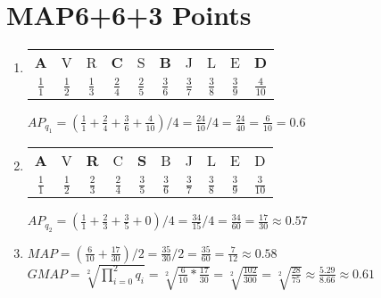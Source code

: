 \documentclass[10pt,a4paper]{article}
\begin{document}
\section{\hfill MAP\hfill 6+6+3 Points}
\begin{enumerate}
    \item \begin{tabular}[t]{cccccccccc}
            \textbf{A}   &V  &R  &\textbf{C}  &S  &\textbf{B}  &J  &L  &E  &\textbf{D} \\
            $\frac{1}{1}$   &$\frac{1}{2}$&$\frac{1}{3}$&$\frac{2}{4}$&$\frac{2}{5}$&$\frac{3}{6}$&$\frac{3}{7}$&$\frac{3}{8}$&$\frac{3}{9}$&$\frac{4}{10}$
        \end{tabular}
        
        $AP_{q_1} = (\frac{1}{1}+\frac{2}{4}+\frac{3}{6}+\frac{4}{10})/4 = \frac{24}{10}/4 = \frac{24}{40} = \frac{6}{10} = 0.6$\\
    \item \begin{tabular}[t]{cccccccccc}
            \textbf{A}&V&\textbf{R}&C&\textbf{S}&B&J&L&E&D \\
            $\frac{1}{1}$   &$\frac{1}{2}$&$\frac{2}{3}$&$\frac{2}{4}$&$\frac{3}{5}$&$\frac{3}{6}$&$\frac{3}{7}$&$\frac{3}{8}$&$\frac{3}{9}$&$\frac{3}{10}$
        \end{tabular}
        
        $AP_{q_2} = (\frac{1}{1}+\frac{2}{3}+\frac{3}{5}+0)/4 = \frac{34}{15}/4 = \frac{34}{60} = \frac{17}{30}\approx 0.57$\\
    \item $MAP=(\frac{6}{10}+\frac{17}{30})/2 = \frac{35}{30}/2 = \frac{35}{60} = \frac{7}{12} \approx 0.58$\\
    
        $GMAP=\sqrt[2]{\prod_{i=0}^2q_i} = \sqrt[2]{\frac{6}{10}*\frac{17}{30}} = \sqrt[2]{\frac{102}{300}} = \sqrt[2]{\frac{28}{75}}\approx \frac{5.29}{8.66}\approx 0.61$
\end{enumerate}
\end{document}
